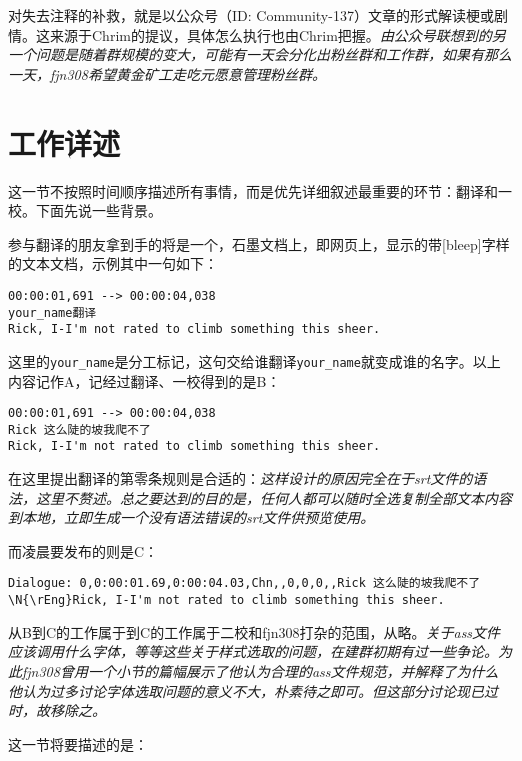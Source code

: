 \documentclass{ctexart}
\begin{document}
对失去注释的补救，就是以公众号（ID: Community-137）文章的形式解读梗或剧情。这来源于Chrim的提议，具体怎么执行也由Chrim把握。\emph{\small 由公众号联想到的另一个问题是随着群规模的变大，可能有一天会分化出粉丝群和工作群，如果有那么一天，fjn308希望黄金矿工走吃元愿意管理粉丝群。}

\section{工作详述}

这一节不按照时间顺序描述所有事情，而是优先详细叙述最重要的环节：翻译和一校。下面先说一些背景。

参与翻译的朋友拿到手的将是一个，石墨文档上，即网页上，显示的带[bleep]字样的文本文档，示例其中一句如下：

{\small
\begin{verbatim}
00:00:01,691 --> 00:00:04,038
your_name翻译
Rick, I-I'm not rated to climb something this sheer.
\end{verbatim}
}

这里的\texttt{your\_name}是分工标记，这句交给谁翻译\texttt{your\_name}就变成谁的名字。以上内容记作A，记经过翻译、一校得到的是B：

{\small
\begin{verbatim}
00:00:01,691 --> 00:00:04,038
Rick 这么陡的坡我爬不了
Rick, I-I'm not rated to climb something this sheer.
\end{verbatim}
}

在这里提出翻译的第零条规则是合适的：\emph{\small 这样设计的原因完全在于srt文件的语法，这里不赘述。总之要达到的目的是，任何人都可以随时全选复制全部文本内容到本地，立即生成一个没有语法错误的srt文件供预览使用。}

而凌晨要发布的则是C：

{\small
\begin{verbatim}
Dialogue: 0,0:00:01.69,0:00:04.03,Chn,,0,0,0,,Rick 这么陡的坡我爬不了
\N{\rEng}Rick, I-I'm not rated to climb something this sheer.
\end{verbatim}
}

从B到C的工作属于到C的工作属于二校和fjn308打杂的范围，从略。\emph{\small 关于ass文件应该调用什么字体，等等这些关于样式选取的问题，在建群初期有过一些争论。为此fjn308曾用一个小节的篇幅展示了他认为合理的ass文件规范，并解释了为什么他认为过多讨论字体选取问题的意义不大，朴素待之即可。但这部分讨论现已过时，故移除之。}

这一节将要描述的是：
\end{document}
